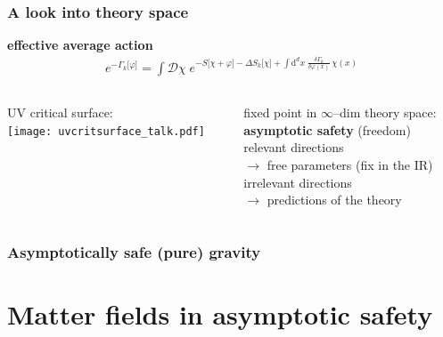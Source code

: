 \documentclass[]{beamer}  %
\begin{document}
\addtocounter{framenumber}{-1}
\begin{frame}
  \frametitle{A look into theory space}
  \vspace{7.5pt}
  \textbf{effective average action}
  \begin{align*}
    \boxed{
    e^{ - \Gamma_k \lbrack \varphi \rbrack }
    = \int \mathcal D \chi \;
    e^{
      - S \lbrack \chi + \varphi \rbrack
      - \Delta S_k \lbrack \chi \rbrack
      + \int \mathrm d^dx \;
      \frac{ \delta \Gamma_k }{ \delta \varphi (x) }
      \, \chi(x)
    }
    }
  \end{align*}
  \vspace{2pt}

  \begin{columns}[T]
    \begin{column}{.6\textwidth}
        UV critical surface:\\[10pt]
        \texttt{[image: uvcritsurface\_talk.pdf]}
    \end{column}
    \begin{column}{.4\textwidth}
      \begin{center}
        fixed point in $\infty$--dim theory space:\\
        \textbf{asymptotic safety} (freedom)\\[20pt]
        relevant directions\\[3pt]
        $\rightarrow$ free parameters (fix in the IR)\\[10pt]
        irrelevant directions\\[3pt]
        $\rightarrow$ predictions of the theory
      \end{center}
    \end{column}
  \end{columns}
\end{frame}



\begin{frame}
  \frametitle{Asymptotically safe (pure) gravity }
\end{frame}

\section{Matter fields in asymptotic safety}
\end{document}
